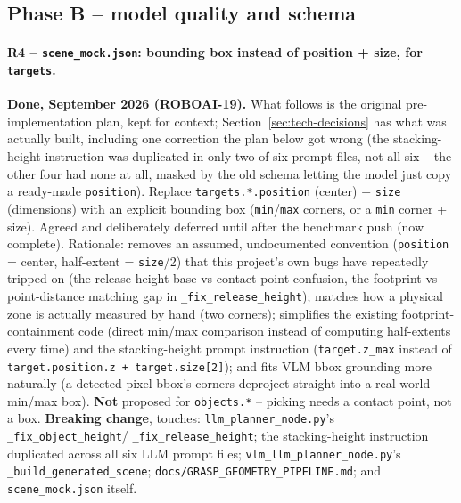 \subsection{Phase B -- model quality and schema}

\paragraph{R4 -- \texttt{scene\_mock.json}: bounding box instead of
position + size, for \texttt{targets}.} \textbf{Done, September 2026
(ROBOAI-19).} What follows is the original pre-implementation plan, kept
for context; Section~\ref{sec:tech-decisions} has what was actually built,
including one correction the plan below got wrong (the stacking-height
instruction was duplicated in only two of six prompt files, not all six --
the other four had none at all, masked by the old schema letting the model
just copy a ready-made \texttt{position}). Replace
\texttt{targets.*.position} (center) + \texttt{size} (dimensions) with an
explicit bounding box (\texttt{min}/\texttt{max} corners, or a \texttt{min}
corner + size). Agreed and deliberately deferred until after the benchmark
push (now complete). Rationale: removes an assumed, undocumented convention
(\texttt{position} = center, half-extent = \texttt{size}/2) that this
project's own bugs have repeatedly tripped on (the release-height
base-vs-contact-point confusion, the footprint-vs-point-distance matching
gap in \texttt{\_fix\_release\_height}); matches how a physical zone is
actually measured by hand (two corners); simplifies the existing
footprint-containment code (direct min/max comparison instead of computing
half-extents every time) and the stacking-height prompt instruction
(\texttt{target.z\_max} instead of
\texttt{target.position.z + target.size[2]}); and fits VLM bbox grounding
more naturally (a detected pixel bbox's corners deproject straight into a
real-world min/max box). \textbf{Not} proposed for \texttt{objects.*} --
picking needs a contact point, not a box. \textbf{Breaking change}, touches:
\texttt{llm\_planner\_node.py}'s \texttt{\_fix\_object\_height}/
\texttt{\_fix\_release\_height}; the stacking-height instruction duplicated
across all six LLM prompt files; \texttt{vlm\_llm\_planner\_node.py}'s
\texttt{\_build\_generated\_scene}; \texttt{docs/GRASP\_GEOMETRY\_PIPELINE.md};
and \texttt{scene\_mock.json} itself.

